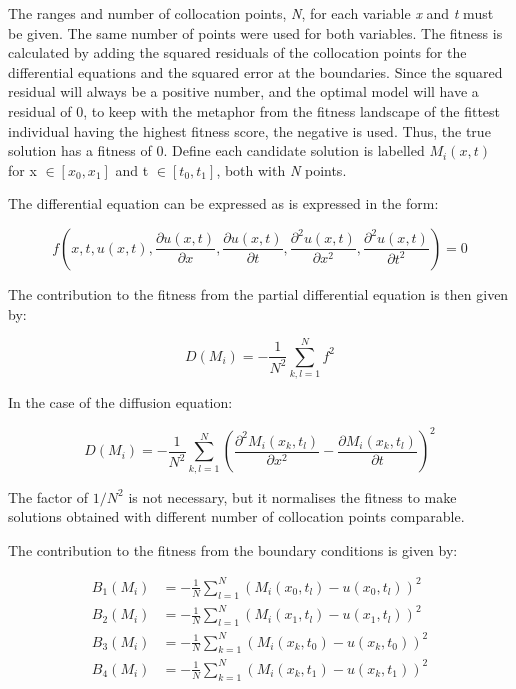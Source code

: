 \documentclass[multicolumn, 12pt]{extarticle}
\begin{document}
The ranges and number of collocation points, \textit{N}, for each variable \textit{x} and \textit{t} must be given. The same number of points were used for both variables. The fitness is calculated by adding the squared residuals of the collocation points for the differential equations and the squared error at the boundaries. Since the squared residual will always be a positive number, and the optimal model will have a residual of 0, to keep with the metaphor from the fitness landscape of the fittest individual having the highest fitness score, the negative is used. Thus, the true solution has a fitness of 0. Define each candidate solution is labelled $M_{i}(x, t)$ for x $\in [x_{0}, x_{1}]$ and t $\in [t_{0}, t_{1}]$, both with \textit{N} points. 


The differential equation can be expressed as is expressed in the form:

\begin{equation*}
    f \left( x, t, u(x, t), \frac{\partial u(x, t)}{\partial x}, \frac{\partial u(x, t)}{\partial t}, \frac{\partial^2 u(x, t) }{\partial x^2}, \frac{\partial^2 u(x, t) }{\partial t^2} \right) = 0
\end{equation*}


The contribution to the fitness from the partial differential equation is then given by: 

\begin{equation*}
    D(M_{i}) = -\frac{1}{N^{2}}\sum_{k, l=1}^{N} f^2
\end{equation*}

In the case of the diffusion equation: 

\begin{equation*}
    D(M_{i}) = - \frac{1}{N^{2}} \sum_{k, l=1}^{N} \left( \frac{\partial^2 M_i(x_k, t_l) }{\partial x^2} - \frac{\partial M_i(x_k, t_l)}{\partial t} \right) ^2
\end{equation*}

The factor of $1/N^{2}$ is not necessary, but it normalises the fitness to make solutions obtained with different number of collocation points comparable. 


The contribution to the fitness from the boundary conditions is given by: 

\begin{align*}
    B_1(M_{i}) & = -\frac{1}{N} \sum_{l=1}^{N} \left( M_i(x_0, t_l)- u(x_0, t_l)\right) ^2  \\
    B_2(M_{i}) & = -\frac{1}{N} \sum_{l=1}^{N} (M_i(x_1, t_l)- u(x_1, t_l))^2  \\
    B_3(M_{i}) & = -\frac{1}{N} \sum_{k=1}^{N} (M_i(x_k, t_0)- u(x_k, t_0))^2  \\
    B_4(M_{i}) & = -\frac{1}{N} \sum_{k=1}^{N} (M_i(x_k, t_1)- u(x_k, t_1))^2  \\
\end{align*}
\end{document}
